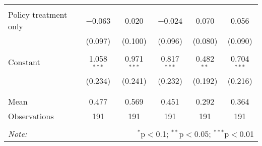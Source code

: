 \begin{tabular}{@{\extracolsep{5pt}}lccccc}
  & & & & & \\ 
 Policy treatment only & $-$0.063 & 0.020 & $-$0.024 & 0.070 & 0.056 \\ 
  & (0.097) & (0.100) & (0.096) & (0.080) & (0.090) \\ 
  & & & & & \\ 
 Constant & 1.058$^{***}$ & 0.971$^{***}$ & 0.817$^{***}$ & 0.482$^{**}$ & 0.704$^{***}$ \\ 
  & (0.234) & (0.241) & (0.232) & (0.192) & (0.216) \\ 
  & & & & & \\ 
\hline \\[-1.8ex] 
Mean & 0.477 & 0.569 & 0.451 & 0.292 & 0.364 \\ 
Observations & 191 & 191 & 191 & 191 & 191 \\ 
\hline 
\hline \\[-1.8ex] 
\textit{Note:}  & \multicolumn{5}{r}{$^{*}$p$<$0.1; $^{**}$p$<$0.05; $^{***}$p$<$0.01} \\ 
\end{tabular} 
